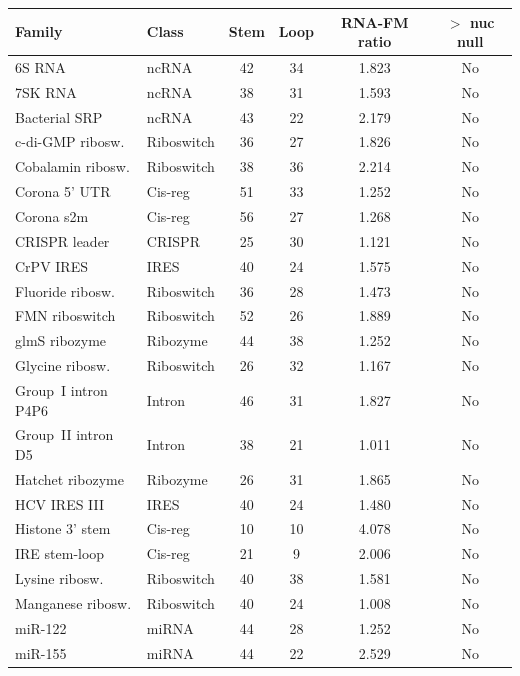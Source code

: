 \documentclass[11pt]{article}
\begin{document}
\begin{table}[h]
\centering
\small
\begin{tabular}{@{}llcccc@{}}
\toprule
\textbf{Family} & \textbf{Class} & \textbf{Stem} & \textbf{Loop} &
  \textbf{RNA-FM ratio} & \textbf{$>$ nuc null} \\
\midrule
6S RNA              & ncRNA       & 42 & 34 & 1.823 & No \\
7SK RNA             & ncRNA       & 38 & 31 & 1.593 & No \\
Bacterial SRP       & ncRNA       & 43 & 22 & 2.179 & No \\
c-di-GMP ribosw.    & Riboswitch  & 36 & 27 & 1.826 & No \\
Cobalamin ribosw.   & Riboswitch  & 38 & 36 & 2.214 & No \\
Corona 5' UTR       & Cis-reg     & 51 & 33 & 1.252 & No \\
Corona s2m          & Cis-reg     & 56 & 27 & 1.268 & No \\
CRISPR leader       & CRISPR      & 25 & 30 & 1.121 & No \\
CrPV IRES           & IRES        & 40 & 24 & 1.575 & No \\
Fluoride ribosw.    & Riboswitch  & 36 & 28 & 1.473 & No \\
FMN riboswitch      & Riboswitch  & 52 & 26 & 1.889 & No \\
glmS ribozyme       & Ribozyme    & 44 & 38 & 1.252 & No \\
Glycine ribosw.     & Riboswitch  & 26 & 32 & 1.167 & No \\
Group~I intron P4P6 & Intron      & 46 & 31 & 1.827 & No \\
Group~II intron D5  & Intron      & 38 & 21 & 1.011 & No \\
Hatchet ribozyme    & Ribozyme    & 26 & 31 & 1.865 & No \\
HCV IRES III        & IRES        & 40 & 24 & 1.480 &
  No \\
Histone 3' stem     & Cis-reg     & 10 & 10 & 4.078 & No \\
IRE stem-loop       & Cis-reg     & 21 &  9 & 2.006 & No \\
Lysine ribosw.      & Riboswitch  & 40 & 38 & 1.581 & No \\
Manganese ribosw.   & Riboswitch  & 40 & 24 & 1.008 & No \\
miR-122             & miRNA       & 44 & 28 & 1.252 & No \\
miR-155             & miRNA       & 44 & 22 & 2.529 & No \\

\end{tabular}
\end{table}
\end{document}
